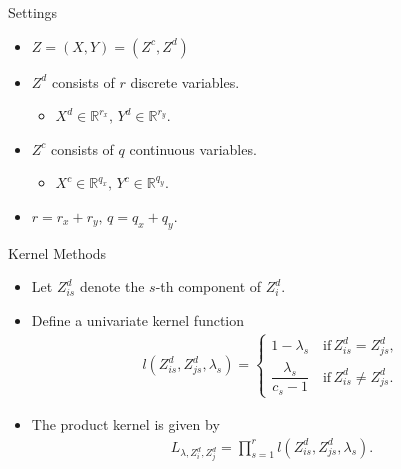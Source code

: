 \documentclass[xcolor=svgnames,dvipdfmx,cjk]{beamer}
\theoremstyle{example}
\begin{document}
\begin{frame}{Settings}
\begin{itemize}
  \item $ Z = (X, Y) = (Z^c, Z^d) $
  \item $ Z^d $ consists of $r$ discrete variables.
   \begin{itemize}
    \item $ X^d \in \mathbb{R}^{r_x} ,\, Y^d \in \mathbb{R}^{r_y} $.
   \end{itemize}
  \item $ Z^c $ consists of $q$ continuous variables.
   \begin{itemize}
    \item $ X^c \in \mathbb{R}^{q_x} ,\, Y^c \in \mathbb{R}^{q_y} $.
   \end{itemize}
  \item $r = r_x + r_y,\,q = q_x + q_y$.
\end{itemize}  
\end{frame}

\begin{frame}{Kernel Methods}
  \begin{itemize}
    \item Let $Z_{is}^d$ denote the $s$-th component of $Z_i^d$.
    \item Define a univariate kernel function
          \begin{align*}
            l(Z_{is}^d , Z_{js}^d , \lambda_s) = 
            \left\{
            \begin{array}{l}
              1 - \lambda_s 
              \quad
              \text{if} \, 
              Z_{is}^d = Z_{js}^d , \\
              \dfrac{\lambda_s}{c_s-1}
              \quad
              \text{if} \, 
              Z_{is}^d \neq Z_{js}^d .
            \end{array}
            \right.
          \end{align*}
    \item The product kernel is given by
    \begin{align*}
      L_{\lambda, Z_{i}^d , Z_{j}^d} 
      =
      \prod_{s=1}^{r}  l(Z_{is}^d , Z_{js}^d , \lambda_s).
    \end{align*}
  \end{itemize}
\end{frame}
\end{document}
